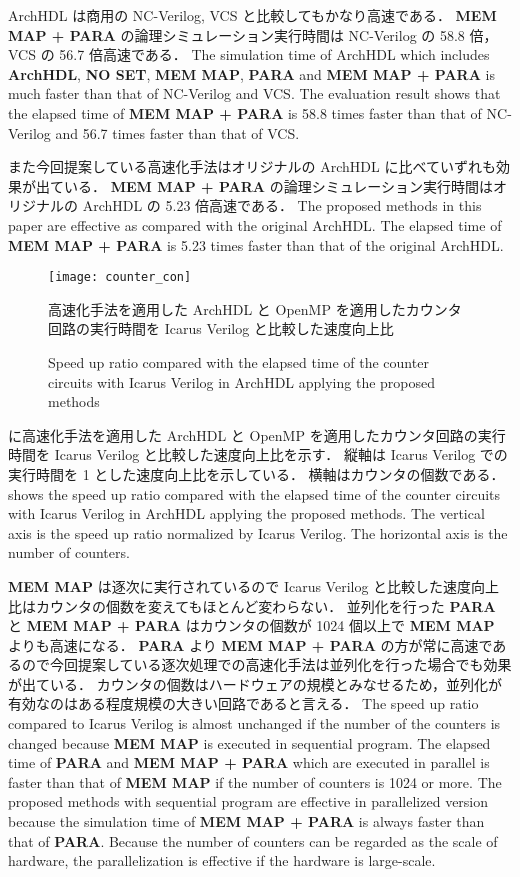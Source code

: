 ArchHDL は商用の NC-Verilog, VCS と比較してもかなり高速である．
\textbf{MEM MAP + PARA} の論理シミュレーション実行時間は NC-Verilog の 58.8 倍，VCS の 56.7 倍高速である．
\fi
The simulation time of ArchHDL which includes \textbf{ArchHDL}, \textbf{NO SET}, \textbf{MEM MAP}, \textbf{PARA} and \textbf{MEM MAP + PARA} is much faster than that of NC-Verilog and VCS.
The evaluation result shows that the elapsed time of \textbf{MEM MAP + PARA} is 58.8 times faster than that of NC-Verilog and 56.7 times faster than that of VCS.

また今回提案している高速化手法はオリジナルの ArchHDL に比べていずれも効果が出ている．
\textbf{MEM MAP + PARA} の論理シミュレーション実行時間はオリジナルの ArchHDL の 5.23 倍高速である．
\fi
The proposed methods in this paper are effective as compared with the original ArchHDL.
The elapsed time of \textbf{MEM MAP + PARA} is 5.23 times faster than that of the original ArchHDL.



\begin{figure}[tb]
 \centering
 \texttt{[image: counter\_con]}
 \caption{高速化手法を適用した ArchHDL と OpenMP を適用したカウンタ回路の実行時間を Icarus Verilog と比較した速度向上比}
\fi
 \caption{Speed up ratio compared with the elapsed time of the counter circuits with Icarus Verilog in ArchHDL applying the proposed methods}
 \label{fig:counter_con}
\end{figure}

 に高速化手法を適用した ArchHDL と OpenMP を適用したカウンタ回路の実行時間を Icarus Verilog と比較した速度向上比を示す．
縦軸は Icarus Verilog での実行時間を 1 とした速度向上比を示している．
横軸はカウンタの個数である．
\fi
{} shows the speed up ratio compared with the elapsed time of the counter circuits with Icarus Verilog in ArchHDL applying the proposed methods.
The vertical axis is the speed up ratio normalized by Icarus Verilog.
The horizontal axis is the number of counters.

\textbf{MEM MAP} は逐次に実行されているので Icarus Verilog と比較した速度向上比はカウンタの個数を変えてもほとんど変わらない．
並列化を行った \textbf{PARA} と \textbf{MEM MAP + PARA} はカウンタの個数が 1024 個以上で \textbf{MEM MAP} よりも高速になる．
\textbf{PARA} より \textbf{MEM MAP + PARA} の方が常に高速であるので今回提案している逐次処理での高速化手法は並列化を行った場合でも効果が出ている．
カウンタの個数はハードウェアの規模とみなせるため，並列化が有効なのはある程度規模の大きい回路であると言える．
\fi
The speed up ratio compared to Icarus Verilog is almost unchanged if the number of the counters is changed because \textbf{MEM MAP} is executed in sequential program.
The elapsed time of \textbf{PARA} and \textbf{MEM MAP + PARA} which are executed in parallel is faster than that of \textbf{MEM MAP} if the number of counters is 1024 or more.
The proposed methods with sequential program are effective in parallelized version
because the simulation time of \textbf{MEM MAP + PARA} is always faster than that of \textbf{PARA}.
Because the number of counters can be regarded as the scale of hardware, the parallelization is effective if the hardware is large-scale.


